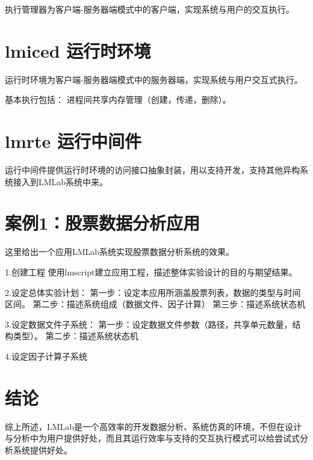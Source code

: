 \documentclass[UTF8, 10pt, a4paper]{ctexart}
\begin{document}
执行管理器为客户端-服务器端模式中的客户端，实现系统与用户的交互执行。

\section{lmiced 运行时环境}

运行时环境为客户端-服务器端模式中的服务器端，实现系统与用户交互式执行。

基本执行包括：
进程间共享内存管理（创建，传递，删除）。

\section{lmrte 运行中间件}

运行中间件提供运行时环境的访问接口抽象封装，用以支持开发，支持其他异构系统接入到LMLab系统中来。

\section{案例1：股票数据分析应用}

这里给出一个应用LMLab系统实现股票数据分析系统的效果。

1.创建工程\newline
使用lmscript建立应用工程，描述整体实验设计的目的与期望结果。\newline

2.设定总体实验计划：\newline
第一步：设定本应用所涵盖股票列表，数据的类型与时间区间。\newline
第二步：描述系统组成（数据文件、因子计算）\newline
第三步：描述系统状态机\newline

3.设定数据文件子系统：\newline
第一步：设定数据文件参数（路径，共享单元数量，结构类型）。\newline
第二步：描述系统状态机\newline

4.设定因子计算子系统\newline
\section{结论}

综上所述，LMLab是一个高效率的开发数据分析、系统仿真的环境，不但在设计与分析中为用户提供好处，而且其运行效率与支持的交互执行模式可以给尝试式分析系统提供好处。
\end{document}
